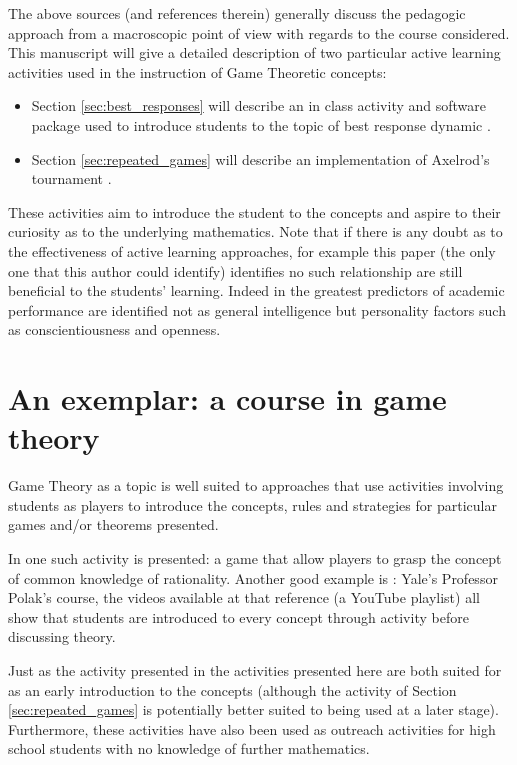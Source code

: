 \documentclass{article}
\begin{document}
The above sources (and references therein) generally discuss the pedagogic
approach from a macroscopic point of view with regards to the course considered.
This manuscript will give a detailed description of two particular active
learning activities used in the instruction of Game Theoretic concepts:

\begin{itemize}
    \item Section \ref{sec:best_responses} will describe an in class activity
        and software package used to introduce students to the topic of best
        response dynamic \cite{Maschler2013}.
    \item Section \ref{sec:repeated_games} will describe an implementation of
        Axelrod's tournament \cite{Axelrod1980a,Axelrod1980a}.
\end{itemize}

These activities aim to introduce the student to the concepts and aspire to
their curiosity as to the underlying mathematics. Note that if there is any
doubt as to the effectiveness of active learning approaches, for example this paper
(the only one that this author could identify) \cite{Andrews2011} identifies no
such relationship are still beneficial to the students' learning.
Indeed in \cite{Poropat2014}  the greatest predictors of
academic performance are identified not as general intelligence \cite{Wright1905} but
personality factors such as conscientiousness and openness.

\section{An exemplar: a course in game theory}\label{sec:game_theory}

Game Theory as a topic is well suited to approaches that use activities
involving students as players to introduce the concepts, rules and strategies
for particular games and/or theorems presented.

In \cite{Brokaw2004} one such activity is presented: a game that allow players
to grasp the concept of common knowledge of rationality. Another good example is
\cite{Polak2008}: Yale's Professor Polak's course, the videos available at that
reference (a YouTube playlist) all show that students are introduced to every
concept through activity before discussing theory.

Just as the activity presented in \cite{Brokaw2004} the activities presented
here are both suited for as an early introduction to the concepts (although the
activity of Section \ref{sec:repeated_games} is potentially better suited to
being used at a later stage). Furthermore, these activities have also been used
as outreach activities for high school students with no knowledge of further
mathematics.
\end{document}

